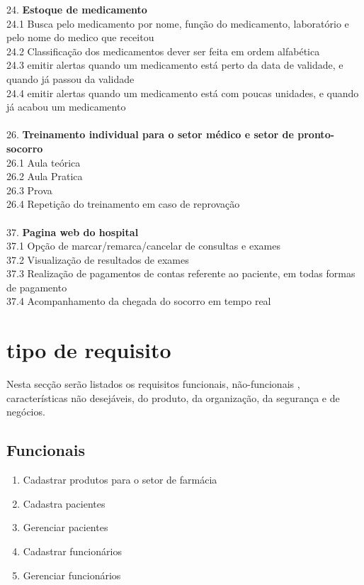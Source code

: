 24. \textbf{Estoque de medicamento}\\
24.1 Busca pelo medicamento por nome, função do medicamento, laboratório e pelo nome do medico que receitou\\
24.2 Classificação dos medicamentos dever ser feita em ordem alfabética\\
24.3 emitir alertas quando um medicamento está perto da data de validade, e quando já passou da validade\\
24.4 emitir alertas quando um medicamento está com poucas unidades, e quando já acabou um medicamento\\
\\
26. \textbf{Treinamento individual para o setor médico e setor de pronto-socorro}\\
26.1 Aula teórica\\
26.2 Aula Pratica\\
26.3 Prova\\
26.4 Repetição do treinamento em caso de reprovação\\
\\
37. \textbf{Pagina web do hospital}\\
37.1 Opção de marcar/remarca/cancelar de consultas e exames\\
37.2 Visualização de resultados de exames\\
37.3 Realização de pagamentos de contas referente ao paciente, em todas formas de pagamento\\
37.4 Acompanhamento da chegada do socorro em tempo real\\




\section{tipo de requisito}
Nesta secção serão listados os requisitos funcionais, não-funcionais , características não desejáveis, do produto, da organização, da segurança e de negócios.
\subsection{Funcionais}

\begin{enumerate}
  \item Cadastrar produtos para o setor de farmácia
  \item Cadastra pacientes
  \item Gerenciar pacientes
  \item Cadastrar funcionários
  \item Gerenciar funcionários
\end{enumerate}


